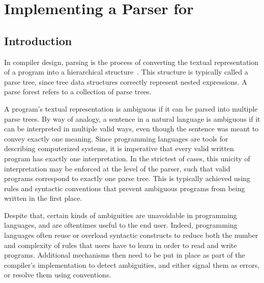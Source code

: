 \chapter{Implementing a Parser for \Beluga}

\section{Introduction}


In compiler design, parsing is the process of converting the textual representation of a program into a hierarchical structure~\cite{aho2007compilers, afroozeh2019practical}.
This structure is typically called a parse tree, since tree data structures correctly represent nested expressions.
A parse forest refers to a collection of parse trees.


A program's textual representation is ambiguous if it can be parsed into multiple parse trees.
By way of analogy, a sentence in a natural language is ambiguous if it can be interpreted in multiple valid ways, even though the sentence was meant to convey exactly one meaning.
Since programming languages are tools for describing computerized systems, it is imperative that every valid written program has exactly one interpretation.
In the strictest of cases, this unicity of interpretation may be enforced at the level of the parser, such that valid programs correspond to exactly one parse tree.
This is typically achieved using rules and syntactic conventions that prevent ambiguous programs from being written in the first place.

Despite that, certain kinds of ambiguities are unavoidable in programming languages, and are oftentimes useful to the end user.
Indeed, programming languages often reuse or overload syntactic constructs to reduce both the number and complexity of rules that users have to learn in order to read and write programs.
Additional mechanisms then need to be put in place as part of the compiler's implementation to detect ambiguities, and either signal them as errors, or resolve them using conventions.


